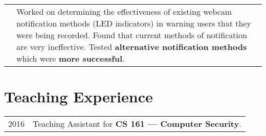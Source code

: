 \documentclass[10pt]{article}
\begin{document}
\begin{tabular}{R{2cm}p{13cm}}
                          &\footnotesize{%
                             Worked on determining the effectiveness of
                             existing webcam notification methods (LED
                             indicators) in warning users that they were being
                             recorded. Found that current methods of
                             notification are very ineffective. Tested
                             \textbf{alternative notification methods} which
                             were \textbf{more successful}.
                            }%


\end{tabular}

\section{Teaching Experience}
\begin{tabular}{R{2cm}p{13cm}}
  2016 & Teaching Assistant for \textbf{CS 161 --- Computer Security}.
\end{tabular}


\nocite{*}
\printbibliography{}

\end{document}
